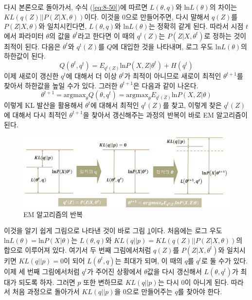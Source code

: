 \documentclass[a4paper]{oblivoir}
\begin{document}
다시 본론으로 돌아가서, 수식 (\ref{eq:8-50})에 따르면 $L(\theta, q)$와 $\textrm{ln} L(\theta)$의 차이는 $KL(q(Z) || P(Z|X,\theta))$이다. 이것을 0으로 만들어주면, 다시 말해서 $q(Z)$를 $P(Z|X,\theta)$와 일치시킨다면, $L(\theta, q)$와 $\textrm{ln} L(\theta)$는 정확히 같게 된다. 따라서 시점 $t$에서 파라미터 $\theta$의 값을 $\theta^{t}$라고 한다면 이 때의 $q^{t}(Z)$는 $P(Z|X,\theta^t)$로 정하는 것이 최적이 된다. 다음은 $\theta^{t}$와 $q^{t}(Z)$를 $Q$에 대입한 것을 나타내며, 로그 우도 $\textrm{ln} L(\theta)$의 하한값이 된다.
\begin{equation}
Q(\theta^t, q^t) = E_{q^{t}(Z)} \textrm{ln} P(X, Z|\theta^t) + H(q^t) \label{eq:8-52}
\end{equation}
이제 새로이 갱신한 $q^t$에 대해서 더 이상 $\theta^{t}$가 최적이 아니므로 새로이 최적인 $\theta^{t+1}$를 찾아서 하한값을 높일 수가 있다. 그러한 $\theta^{t+1}$은 다음과 같이 나온다.  
\begin{equation}
\theta^{t+1} = \textrm{argmax}_{\theta} Q(\theta, q^t) = \textrm{argmax}_{\theta} E_{q^{t}(Z)} \textrm{ln} P(X, Z|\theta) \label{eq:8-53}
\end{equation}
이렇게 KL 발산을 활용해서 $\theta^{t}$에 대해서 최적인 $q^{t}(Z)$를 찾고, 이렇게 찾은 $q^{t}(Z)$에 대해서 다시 최적인 $\theta^{t+1}$을 찾아서 갱신해주는 과정의 반복이 바로 EM 알고리즘이 된다. \\

\begin{figure}[ht] \centering 
\includegraphics[scale=0.45]{fig8_15.png} 
\caption{EM 알고리즘의 반복}
\label{fig:8-15}
\end{figure}

이것을 알기 쉽게 그림으로 나타낸 것이 바로 그림 \ref{fig:8-15}이다. 처음에는 로그 우도 $\textrm{ln} L(\theta) = \textrm{ln} P(X|\theta)$는 $L(\theta, q)$와 $KL(q||p) = KL(q(Z) || P(Z|X,\theta))$의 합으로 이루어져 있다. 여기서 두 번째 그림에서처럼 $q(Z)$를 $P(Z|X,\theta^{t})$와 일치시키면 $KL(q||p)=0$이 되어 $L(\theta^{t}, q)$는 최대가 되며, 이 때의 $q$를 $q^{t}$로 둘 수가 있다. 이제 세 번째 그림에서처럼 $q^{t}$가 주어진 상황에서 $\theta$값을 다시 갱신해서 $L(\theta, q^{t})$가 최대가 되도록 하자. 그러면 $p$ 또한 변하므로 $KL(q||p)$는 다시 0이 아니게 된다. 따라서 처음 과정으로 돌아가서 $KL(q||p)$을 0으로 만들어주는 $q$를 찾아야 한다.       
\end{document}
